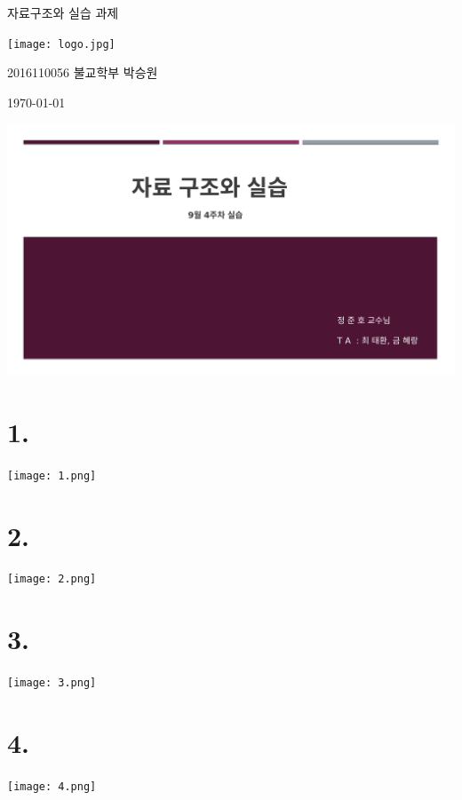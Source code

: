 \documentclass[11pt,a4paper]{article}
\begin{document}
\begin{center}
	\vspace*{3cm}
	{\fontsize{50}{50}자료구조와  실습  과제}
	\vspace{5cm}	


\texttt{[image: logo.jpg]}

\Huge2016110056 불교학부 박승원

\today

\end{center}
\newpage
\noindent
\lstset{language=C, columns=flexible, tabsize=4, frame=shadowbox, showstringspaces=false, breaklines=true, basicstyle=\Large}
\includegraphics[page=2, width=\textwidth]{1.pdf}
\newpage
\section*{1.}
	
%
\texttt{[image: 1.png]}	

\newpage
\section*{2.}	
	
\texttt{[image: 2.png]}	


\newpage
\section*{3.}
	
\texttt{[image: 3.png]}	


\newpage
\section*{4.}
	
\texttt{[image: 4.png]}	
\end{document}
